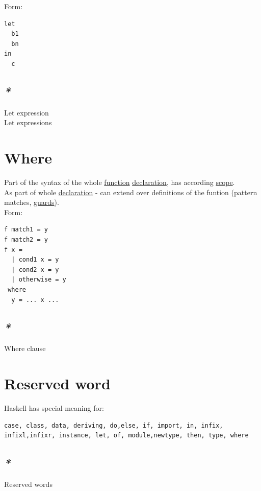 \documentclass[a4paper,14pt,oneside]{book}
\begin{document}
Form:\\
\begin{verbatim}
let
  b1
  bn
in
  c
\end{verbatim}

\subsection{\emph{*}}
\label{sec:org474c67b}

\label{org06288a3}Let expression\\
\label{orga1154a1}Let expressions\\

\section{\label{org12b3f26}Where}
\label{sec:orgf66991d}
Part of the syntax of the whole \hyperref[org9530a6b]{function} \hyperref[orgd4ba3e1]{declaration}, has according \hyperref[orgbff528d]{scope}.\\

As part of whole \hyperref[orgd4ba3e1]{declaration} - can extend over definitions of the funtion (pattern matches, \hyperref[org57d9f6a]{guards}).\\

Form:\\
\begin{verbatim}
f match1 = y
f match2 = y
f x =
  | cond1 x = y
  | cond2 x = y
  | otherwise = y
 where
  y = ... x ...
\end{verbatim}

\subsection{\emph{*}}
\label{sec:org6323483}

\label{org5df7593}Where clause\\

\section{\label{orgcc37244}Reserved word}
\label{sec:orge9e7f95}
Haskell has special meaning for:\\
\begin{verbatim}
case, class, data, deriving, do,else, if, import, in, infix, infixl,infixr, instance, let, of, module,newtype, then, type, where
\end{verbatim}

\subsection{\emph{*}}
\label{sec:org20a2b83}
\label{orge94bfe2}Reserved words\\
\end{document}
